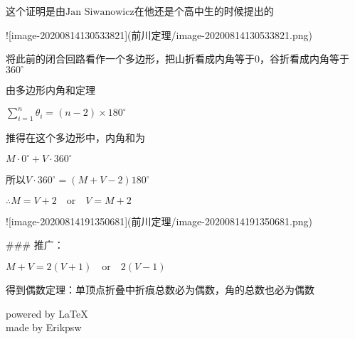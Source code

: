 \documentclass[a4paper,12pt]{article}
\begin{document}
这个证明是由$\text{Jan Siwanowicz}$在他还是个高中生的时候提出的

![image-20200814130533821](前川定理/image-20200814130533821.png)

将此前的闭合回路看作一个多边形，把山折看成内角等于$0$，谷折看成内角等于$360^{\circ}$

由多边形内角和定理

$\sum\limits_{i=1}^n\theta_i=(n-2)×180^{\circ}$

推得在这个多边形中，内角和为

$M · 0^{\circ} +V · 360^{\circ}$

所以$V · 360^{\circ} = (M +V-2)180^{\circ}$

$\therefore M = V +2 \quad \text{or}\quad V = M + 2$

![image-20200814191350681](前川定理/image-20200814191350681.png)

### 推广：

$M + V = 2(V+1) \quad \text{or} \quad2(V − 1)$

得到偶数定理：单顶点折叠中折痕总数必为偶数，角的总数也必为偶数
\begin{flushright}
    powered by \LaTeX\\
    made by Erikpsw\\ 
\end{flushright}
\end{document}
